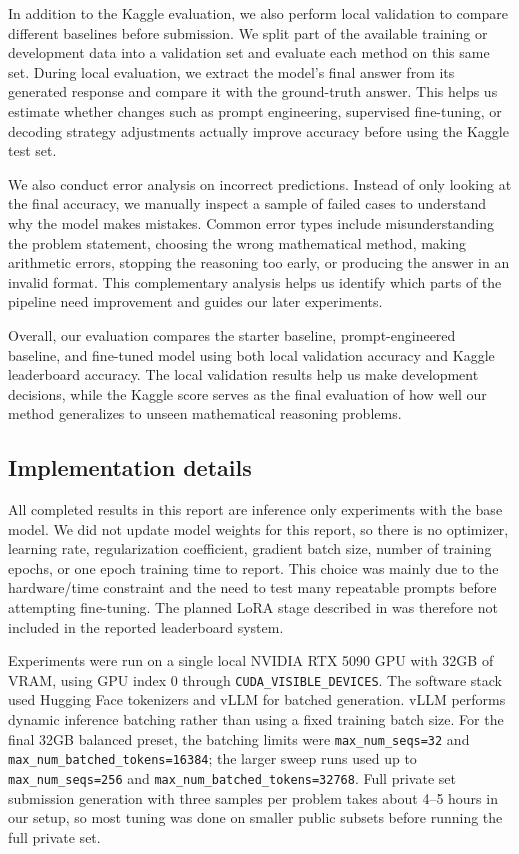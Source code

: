 \documentclass{article}
\begin{document}
In addition to the Kaggle evaluation, we also perform local validation to compare different baselines before submission. We split part of the available training or development data into a validation set and evaluate each method on this same set. During local evaluation, we extract the model’s final answer from its generated response and compare it with the ground-truth answer. This helps us estimate whether changes such as prompt engineering, supervised fine-tuning, or decoding strategy adjustments actually improve accuracy before using the Kaggle test set.

We also conduct error analysis on incorrect predictions. Instead of only looking at the final accuracy, we manually inspect a sample of failed cases to understand why the model makes mistakes. Common error types include misunderstanding the problem statement, choosing the wrong mathematical method, making arithmetic errors, stopping the reasoning too early, or producing the answer in an invalid format. This complementary analysis helps us identify which parts of the pipeline need improvement and guides our later experiments.

Overall, our evaluation compares the starter baseline, prompt-engineered baseline, and fine-tuned model using both local validation accuracy and Kaggle leaderboard accuracy. The local validation results help us make development decisions, while the Kaggle score serves as the final evaluation of how well our method generalizes to unseen mathematical reasoning problems.
% 
\subsection{Implementation details}
\label{sec:implementation_details}

All completed results in this report are inference only experiments with the  base model. We did not update model weights for this report, so there is no optimizer, learning rate, regularization coefficient, gradient batch size, number of training epochs, or one epoch training time to report. This choice was mainly due to the hardware/time constraint and the need to test many repeatable prompts before attempting fine-tuning. The planned LoRA stage described in  was therefore not included in the reported leaderboard system.

Experiments were run on a single local NVIDIA RTX 5090 GPU with 32GB of VRAM, using GPU index 0 through \texttt{CUDA\_VISIBLE\_DEVICES}. The software stack used Hugging Face tokenizers and vLLM for batched generation. vLLM performs dynamic inference batching rather than using a fixed training batch size. For the final 32GB balanced preset, the batching limits were \texttt{max\_num\_seqs=32} and \texttt{max\_num\_batched\_tokens=16384}; the larger sweep runs used up to \texttt{max\_num\_seqs=256} and \texttt{max\_num\_batched\_tokens=32768}. Full private set submission generation with three samples per problem takes about 4--5 hours in our setup, so most tuning was done on smaller public subsets before running the full private set.
\end{document}
